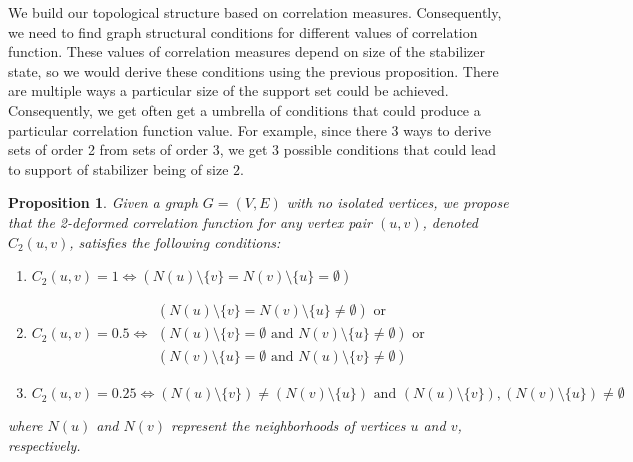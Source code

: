 \documentclass{article}
\newtheorem{prop}[theorem]{Proposition}
\begin{document}
We build our topological structure based on correlation measures. Consequently, we need to find graph structural conditions for different values of correlation function. These values of correlation measures depend on size of the stabilizer state, so we would derive these conditions using the previous proposition. There are multiple ways a particular size of the support set could be achieved. Consequently, we get often get a umbrella of conditions that could produce a particular correlation function value. For example, since there 3 ways to derive sets of order 2 from sets of order 3, we get 3 possible conditions that could lead to support of stabilizer being of size $2$.

\begin{prop} \label{prop:correlation_function_relation_with_graph_structure}
Given a graph $ G = (V, E) $ with no isolated vertices, we propose that the 2-deformed correlation function for any vertex pair $ (u, v) $, denoted $ C_2(u, v) $, satisfies the following conditions:
\begin{enumerate}
    \item $C_2(u, v) = 1 \iff (N(u) \setminus \{v\} = N(v) \setminus \{u\} = \emptyset)$
    \item
    $C_2(u, v) = 0.5 \iff 
\begin{aligned}(N(u) \setminus \{v\} = N(v) \setminus \{u\} \neq \emptyset) \text{ or } \\
(N(u) \setminus \{v\} = \emptyset \text{ and } N(v) \setminus \{u\} \neq \emptyset) 
\text{ or } \\
(N(v) \setminus \{u\} = \emptyset \text{ and } N(u) \setminus \{v\} \neq \emptyset)
\end{aligned}$


    \item $ C_2(u, v) = 0.25 \iff (N(u) \setminus \{v\}) \neq (N(v) \setminus \{u\}) \text{ and } (N(u) \setminus \{v\}), (N(v) \setminus \{u\}) \neq \emptyset $

\end{enumerate}

where $ N(u) $ and $ N(v) $ represent the neighborhoods of vertices $ u $ and $ v $, respectively.
\end{prop}
\end{document}
